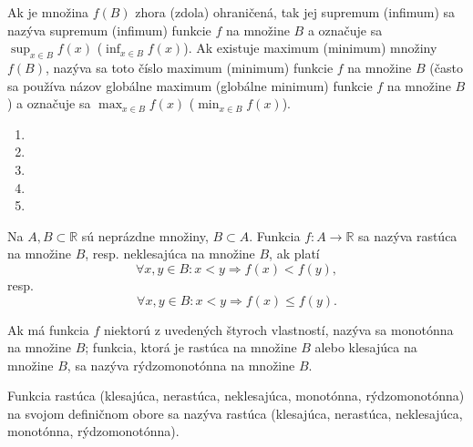Ak je množina $f(B)$ zhora (zdola) ohraničená, tak jej supremum (infimum) sa
nazýva supremum (infimum) funkcie $f$ na množine $B$ a označuje sa $\sup_{x\in
B} f(x)$ ($\inf_{x\in B} f(x)$). Ak existuje maximum (minimum) množiny $f(B)$,
nazýva sa toto číslo maximum (minimum) funkcie $f$ na množine $B$ (často sa
používa názov globálne maximum (globálne minimum) funkcie $f$ na množine
$B$) a označuje sa $\max_{x\in B}f(x)$ ($\min_{x\in B}f(x)$).





\begin{enumerate}[resume]
  \item {}
  \item {}
  \item {}
  \item {}
  \item {}
\end{enumerate}

Na $A,B\subset\mathbb{R}$ sú neprázdne množiny, $B\subset A$. Funkcia
$f:A\rightarrow\mathbb{R}$ sa nazýva rastúca na množine $B$, resp. neklesajúca
na množine $B$, ak platí $$\forall x,y\in B:x<y\Rightarrow f(x)<f(y),$$ resp.
$$\forall x,y\in B:x<y\Rightarrow f(x)\leq f(y).$$

Ak má funkcia $f$ niektorú z uvedených štyroch vlastností, nazýva sa monotónna
na množine $B$; funkcia, ktorá je rastúca na množine $B$ alebo klesajúca na
množine $B$, sa nazýva rýdzomonotónna na množine $B$.

Funkcia rastúca (klesajúca, nerastúca, neklesajúca, monotónna, rýdzomonotónna)
na svojom definičnom obore sa nazýva rastúca (klesajúca, nerastúca, neklesajúca,
monotónna, rýdzomonotónna).

